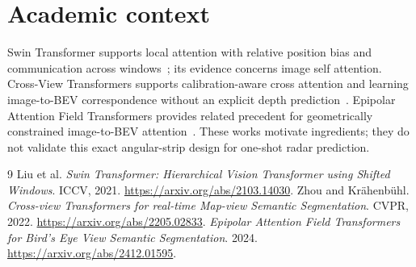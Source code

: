 \documentclass[11pt,a4paper]{article}
\begin{document}
\section{Academic context}
Swin Transformer supports local attention with relative position bias and communication across windows~\cite{swin}; its evidence concerns image self attention. Cross-View Transformers supports calibration-aware cross attention and learning image-to-BEV correspondence without an explicit depth prediction~\cite{cvt}. Epipolar Attention Field Transformers provides related precedent for geometrically constrained image-to-BEV attention~\cite{eaformer}. These works motivate ingredients; they do not validate this exact angular-strip design for one-shot radar prediction.

\begin{thebibliography}{9}
 Liu et al. \emph{Swin Transformer: Hierarchical Vision Transformer using Shifted Windows}. ICCV, 2021. \url{https://arxiv.org/abs/2103.14030}.
 Zhou and Kr\"ahenb\"uhl. \emph{Cross-view Transformers for real-time Map-view Semantic Segmentation}. CVPR, 2022. \url{https://arxiv.org/abs/2205.02833}.
 \emph{Epipolar Attention Field Transformers for Bird's Eye View Semantic Segmentation}. 2024. \url{https://arxiv.org/abs/2412.01595}.
\end{thebibliography}
\end{document}
